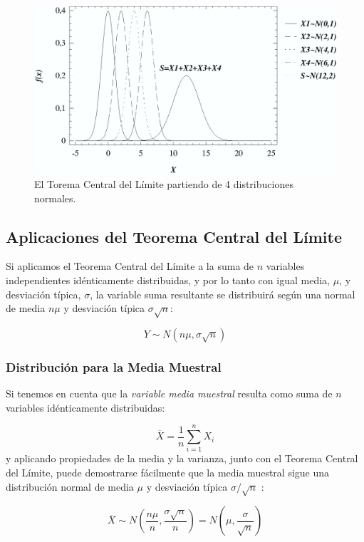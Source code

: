 \documentclass[a4paper]{article}
\begin{document}
\begin{figure}[h!]
\begin{center}
\includegraphics[scale=0.7]{grafica1.eps}
\caption{El Torema Central del Límite partiendo de 4
distribuciones normales.}
\end{center}
\end{figure}



\subsection*{Aplicaciones del Teorema Central del Límite}

Si aplicamos el Teorema Central del Límite a la suma de $n$
variables independientes idénticamente distribuidas, y por lo
tanto con igual media, $\mu$, y desviación típica, $\sigma$, la
variable suma resultante se distribuirá según una normal de media
$n \mu$ y desviación típica $\sigma \sqrt n$:

\[
Y \sim N\left( n \mu , \sigma \sqrt n \right)
\]

\subsubsection*{Distribución para la Media Muestral}

Si tenemos en cuenta que la \emph{variable media muestral} resulta
como suma de $n$ variables idénticamente distribuidas:

\[
\overline X  = \frac{1}{n}\sum\limits_{i = 1}^n {X_i }
\]
y aplicando propiedades de la media y la varianza, junto con el
Teorema Central del Límite, puede demostrarse fácilmente que la
media muestral sigue una distribución normal de media $\mu$ y
desviación típica $\sigma / \sqrt{n}$ :

\[
\overline X \sim N\left( {\frac{{n\mu }}{n},\frac{{\sigma \sqrt n
}}{n}} \right) = N\left( {\mu ,\frac{\sigma }{{\sqrt n }}} \right)
\]
\end{document}
